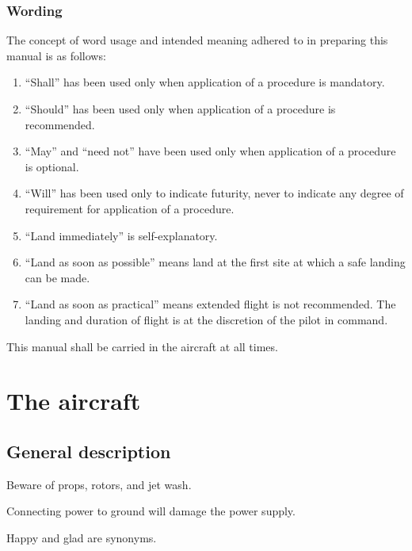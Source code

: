 \documentclass{book}
\begin{document}
\section*{Wording}
The concept of word usage and intended meaning adhered to in preparing this manual is as follows:
\begin{enumerate}
\item ``Shall'' has been used only when application of a procedure is mandatory.
\item ``Should'' has been used only when application of a procedure is recommended.
\item ``May'' and “need not” have been used only when application of a procedure is optional.
\item ``Will'' has been used only to indicate futurity, never to indicate any degree of requirement for application of a procedure.
\item ``Land immediately'' is self-explanatory.
\item ``Land as soon as possible'' means land at the first site at which a safe landing can be made.
\item ``Land as soon as practical'' means extended flight is not recommended. The landing and duration of flight is at the discretion of the pilot in command.
\end{enumerate}
\begin{note}
This manual shall be carried in the aircraft at all times.
\end{note}




\mainmatter
\cleardoublepage
\part{The aircraft}

\cleardoublepage
\chapter{General description}
\begin{warning}
Beware of props, rotors, and jet wash.
\end{warning}

\begin{caution}
Connecting power to ground will damage the power supply. 
\end{caution}

\begin{note}
Happy and glad are synonyms. 
\end{note}
\end{document}
